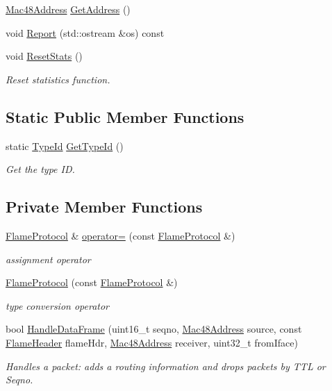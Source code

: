 \begin{DoxyCompactItemize}
\hyperlink{classns3_1_1Mac48Address}{Mac48\+Address} \hyperlink{classns3_1_1flame_1_1FlameProtocol_a837bba2752ab7f2edfb4fc0488656c0a}{Get\+Address} ()
\item 
void \hyperlink{classns3_1_1flame_1_1FlameProtocol_a32bfb167dae175a923cc85b346b9cfde}{Report} (std\+::ostream \&os) const 
\item 
void \hyperlink{classns3_1_1flame_1_1FlameProtocol_ab93a741052cafb5e9ee8caa6e4262119}{Reset\+Stats} ()
\begin{DoxyCompactList}\small\item\em Reset statistics function. \end{DoxyCompactList}\end{DoxyCompactItemize}
\subsection*{Static Public Member Functions}
\begin{DoxyCompactItemize}
\item 
static \hyperlink{classns3_1_1TypeId}{Type\+Id} \hyperlink{classns3_1_1flame_1_1FlameProtocol_a3d2c4844248146480f9daf9668e14d48}{Get\+Type\+Id} ()
\begin{DoxyCompactList}\small\item\em Get the type ID. \end{DoxyCompactList}\end{DoxyCompactItemize}
\subsection*{Private Member Functions}
\begin{DoxyCompactItemize}
\item 
\hyperlink{classns3_1_1flame_1_1FlameProtocol}{Flame\+Protocol} \& \hyperlink{classns3_1_1flame_1_1FlameProtocol_aae9bd836cf37810a6b0919a72560376e}{operator=} (const \hyperlink{classns3_1_1flame_1_1FlameProtocol}{Flame\+Protocol} \&)
\begin{DoxyCompactList}\small\item\em assignment operator \end{DoxyCompactList}\item 
\hyperlink{classns3_1_1flame_1_1FlameProtocol_a841617d92ef39101d8c9c714dab45c85}{Flame\+Protocol} (const \hyperlink{classns3_1_1flame_1_1FlameProtocol}{Flame\+Protocol} \&)
\begin{DoxyCompactList}\small\item\em type conversion operator \end{DoxyCompactList}\item 
bool \hyperlink{classns3_1_1flame_1_1FlameProtocol_a72291eec881a8d8e1233695c0d382a52}{Handle\+Data\+Frame} (uint16\+\_\+t seqno, \hyperlink{classns3_1_1Mac48Address}{Mac48\+Address} source, const \hyperlink{classns3_1_1flame_1_1FlameHeader}{Flame\+Header} flame\+Hdr, \hyperlink{classns3_1_1Mac48Address}{Mac48\+Address} receiver, uint32\+\_\+t from\+Iface)
\begin{DoxyCompactList}\small\item\em Handles a packet\+: adds a routing information and drops packets by T\+TL or Seqno. \end{DoxyCompactList}\end{DoxyCompactItemize}

